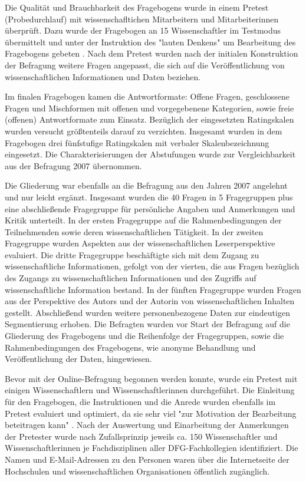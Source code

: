 Die Qualität und Brauchbarkeit des Fragebogens wurde in einem Pretest (Probedurchlauf) mit wissenschafltichen Mitarbeitern und Mitarbeiterinnen überprüft. Dazu wurde der Fragebogen an 15 Wissenschaftler im Testmodus übermittelt und unter der Instruktion des "lauten Denkens" um Bearbeitung des Fragebogens gebeten \cite{raab_2012_fragebogen}. Nach dem Pretest wurden nach der initialen Konstruktion der Befragung weitere Fragen angepasst, die sich auf die Veröffentlichung von wissenschaftlichen Informationen und Daten beziehen.

Im finalen Fragebogen kamen die Antwortformate: Offene Fragen, geschlossene Fragen und Mischformen mit offenen und vorgegebenene Kategorien, sowie freie (offenen) Antwortformate zum Einsatz. Bezüglich der eingesetzten Ratingskalen wurden versucht größtenteils darauf zu verzichten. Insgesamt wurden in dem Fragebogen drei fünfstufige Ratingskalen mit verbaler Skalenbezeichnung eingesetzt. Die Charakterisierungen der Abstufungen wurde zur Vergleichbarkeit aus der Befragung 2007 übernommen.

Die Gliederung war ebenfalls an die Befragung aus den Jahren 2007 angelehnt und nur leicht ergänzt. Insgesamt wurden die 40 Fragen in 5 Fragegruppen plus eine abschließende Fragegruppe für persönliche Angaben und Anmerkungen und Kritik unterteilt. In der ersten Fragegruppe auf die Rahmenbedingungen der Teilnehmenden sowie deren wissenschaftlichen Tätigkeit. In der zweiten Fragegruppe wurden Aspekten aus der wissenschaftlichen Leserperspektive evaluiert. Die dritte Fragegruppe beschäftigte sich mit dem Zugang zu wissenschaftliche Informationen, gefolgt von der vierten, die aus Fragen bezüglich des Zugangs zu wissenschaftlichen Informationen und des Zugriffs auf wissenschaftliche Information bestand. In der fünften Fragegruppe wurden Fragen aus der Perspektive des Autors und der Autorin von wissenschaftlichen Inhalten gestellt. Abschließend wurden weitere personenbezogene Daten zur eindeutigen Segmentierung erhoben. Die Befragten wurden vor Start der Befragung auf die Gliederung des Fragebogens und die Reihenfolge der Fragegruppen, sowie die Rahmenbedingungen des Fragebogens, wie anonyme Behandlung und Veröffentlichung der Daten, hingewiesen.

Bevor mit der Online-Befragung begonnen werden konnte, wurde ein Pretest mit einigen Wissenschaftlern und Wissenschaftlerinnen durchgeführt. Die Einleitung für den Fragebogen, die Instruktionen und die Anrede wurden ebenfalls im Pretest evaluiert und optimiert, da sie sehr viel "zur Motivation der Bearbeitung beteitragen kann" \cite{raab_2012_fragebogen}. Nach der Auswertung und Einarbeitung der Anmerkungen der Pretester wurde nach Zufallsprinzip jeweils ca. 150 Wissenschaftler und Wissenschaftlerinnen je Fachdisziplinen aller DFG-Fachkollegien identifiziert. Die Namen und E-Mail-Adressen zu den Personen waren über die Internetseite der Hochschulen und wissenschaftlichen Organisationen öffentlich zugänglich.

